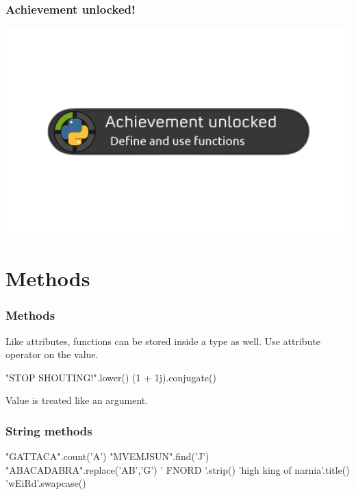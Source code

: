 \documentclass[11pt]{beamer}
\begin{document}
\begin{frame}
  \frametitle{Achievement unlocked!}
  \includegraphics[width=\textwidth]{./img/achievement_unlocked-functions.png}
\end{frame}

\section{Methods}

\begin{frame}[fragile]
  \frametitle{Methods}
  \Enlarge

  \begin{itemize}
  \myitem  Like attributes, functions can be stored inside a type as well. %
  \myitem  Use attribute operator on the value. %
    \begin{semiverbatim}
"STOP SHOUTING!".lower()
(1 + 1j).conjugate()
    \end{semiverbatim} %
  \myitem  Value is treated like an argument.
  \end{itemize}
\end{frame}

\begin{frame}[fragile]
  \frametitle{String methods}
  \Enlarge

  \begin{semiverbatim}
"GATTACA".count('A')
"MVEMJSUN".find('J')
"ABACADABRA".replace('AB','G')
' FNORD '.strip()
'high king of narnia'.title()
'wEiRd'.swapcase()
  \end{semiverbatim}
\end{frame}
\end{document}
